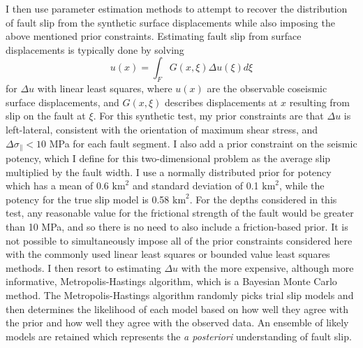 \documentclass[12pt]{article}
\begin{document}
I then use parameter estimation methods to attempt to recover the distribution of fault slip from the synthetic surface displacements while also imposing the above mentioned prior constraints. Estimating fault slip from surface displacements is typically done by solving 
\begin{equation}\label{eq:Forward}
  u(x) = \int_F G(x,\xi) \Delta u(\xi) d\xi
\end{equation}
for $\Delta u$ with linear least squares, where $u(x)$ are the observable coseismic surface displacements, and $G(x,\xi)$ describes displacements at $x$ resulting from slip on the fault at $\xi$.  For this synthetic test, my prior constraints are that $\Delta u$ is left-lateral, consistent with the orientation of maximum shear stress, and $\Delta \sigma_\parallel < 10$ MPa for each fault segment. I also add a prior constraint on the seismic potency, which I define for this two-dimensional problem as the average slip multiplied by the fault width.  I use a normally distributed prior for potency which has a mean of 0.6 $\mathrm{km}^2$ and standard deviation of 0.1 $\mathrm{km}^2$, while the potency for the true slip model is 0.58 $\mathrm{km}^2$. For the depths considered in this test, any reasonable value for the frictional strength of the fault would be greater than 10 MPa, and so there is no need to also include a friction-based prior. It is not possible to simultaneously impose all of the prior constraints considered here with the commonly used linear least squares or bounded value least squares methods.  I then resort to estimating $\Delta u$ with the more expensive, although more informative, Metropolis-Hastings algorithm, which is a Bayesian Monte Carlo method.  The Metropolis-Hastings algorithm randomly picks trial slip models and then determines the likelihood of each model based on how well they agree with the prior and how well they agree with the observed data. An ensemble of likely models are retained which represents the \textit{a posteriori} understanding of fault slip.  
\end{document}
